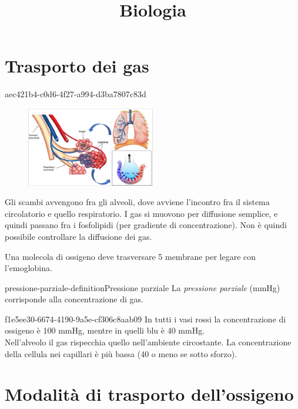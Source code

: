 \documentclass[preview]{standalone}
\begin{document}
\title{Biologia}
\genpage

\section{Trasporto dei gas}

\begin{snippet}{aec421b4-c0d6-4f27-a994-d3ba7807c83d}
    \begin{figure}
        \includegraphics[width=0.5\textwidth]{./resources/gas_transport.png}
    \end{figure}
    
    Gli scambi avvengono fra gli alveoli, dove avviene l'incontro fra il sistema
    circolatorio e quello respiratorio.
    I gas si muovono per diffusione semplice, e quindi passano fra i fosfolipidi (per gradiente di concentrazione).
    Non è quindi possibile controllare la diffusione dei gas.
    
    Una molecola di ossigeno deve trasversare 5 membrane per legare con l'emoglobina.
    \wrapfill
\end{snippet}

\begin{snippetdefinition}{pressione-parziale-definition}{Pressione parziale}
    La \textit{pressione parziale} (mmHg) corrisponde alla concentrazione di gas.
\end{snippetdefinition}

\begin{snippet}{f1e5ee30-6674-4190-9a5e-cf306c8aab09}
    In tutti i vasi rossi la concentrazione di ossigeno è 100 mmHg, mentre in quelli blu è 40 mmHg.
    \\
    Nell'alveolo il gas rispecchia quello nell'ambiente circostante.
    La concentrazione della cellula nei capillari è più bassa (40 o meno se sotto sforzo).
\end{snippet}

\section{Modalità di trasporto dell'ossigeno}
\end{document}
